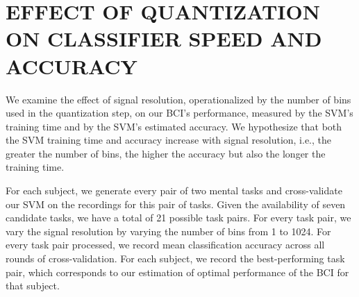 \section{\uppercase{Effect of quantization on classifier speed and accuracy}}
\label{sec:quantization_eval}


We examine the effect of signal resolution, operationalized by the number of bins used in the quantization step, on our BCI's performance, measured by the SVM's training time and by the SVM's estimated accuracy. 
We hypothesize that both the SVM training time and accuracy increase with signal resolution, i.e., the greater the number of bins, the higher the accuracy but also the longer the training time.



For each subject, we generate every pair of two mental tasks and cross-validate our SVM on the recordings for this pair of tasks. Given the availability of seven candidate tasks, we have a total of 21 possible task pairs. For every task pair, we vary the signal resolution by varying the number of bins from 1 to 1024. For every task pair processed, we record mean classification accuracy across all rounds of cross-validation. For each subject, we record the best-performing task pair, which corresponds to our estimation of optimal performance of the BCI for that subject.


